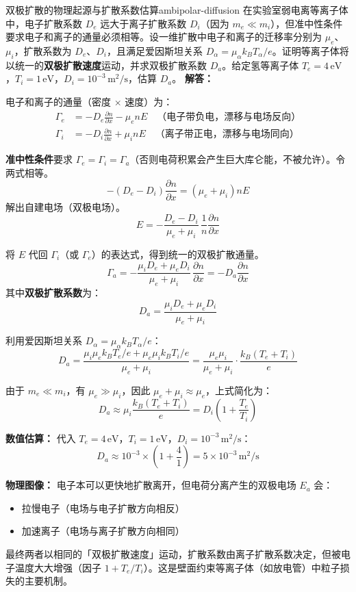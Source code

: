 \begin{example}{双极扩散的物理起源与扩散系数估算}{ambipolar-diffusion}
在实验室弱电离等离子体中，电子扩散系数 $D_e$ 远大于离子扩散系数 $D_i$（因为 $m_e\ll m_i$），但准中性条件要求电子和离子的通量必须相等。设一维扩散中电子和离子的迁移率分别为 $\mu_e$、$\mu_i$，扩散系数为 $D_e$、$D_i$，且满足爱因斯坦关系 $D_\alpha = \mu_\alpha k_{\!B}T_\alpha/e$。证明等离子体将以统一的\textbf{双极扩散速度}运动，并求双极扩散系数 $D_a$。给定氢等离子体 $T_e=4\,\mathrm{eV}$，$T_i=1\,\mathrm{eV}$，$D_i=10^{-3}\,\mathrm{m^2/s}$，估算 $D_a$。
\tcblower
\textbf{解答：}

电子和离子的通量（密度 $\times$ 速度）为：
\begin{align*}
\Gamma_e &= -D_e\frac{\partial n}{\partial x} - \mu_e n E \quad \text{（电子带负电，漂移与电场反向）}\\
\Gamma_i &= -D_i\frac{\partial n}{\partial x} + \mu_i n E \quad \text{（离子带正电，漂移与电场同向）}
\end{align*}

\textbf{准中性条件}要求 $\Gamma_e = \Gamma_i = \Gamma_a$（否则电荷积累会产生巨大库仑能，不被允许）。令两式相等。
\[
-(D_e - D_i)\frac{\partial n}{\partial x} = (\mu_e + \mu_i)nE
\]
解出自建电场（双极电场）。
\[
E = -\frac{D_e - D_i}{\mu_e + \mu_i}\,\frac{1}{n}\frac{\partial n}{\partial x}
\]

将 $E$ 代回 $\Gamma_i$（或 $\Gamma_e$）的表达式，得到统一的双极扩散通量。
\[
\Gamma_a = -\frac{\mu_i D_e + \mu_e D_i}{\mu_e + \mu_i}\,\frac{\partial n}{\partial x} = -D_a\frac{\partial n}{\partial x}
\]
其中\textbf{双极扩散系数}为：
\[
D_a = \frac{\mu_i D_e + \mu_e D_i}{\mu_e + \mu_i}
\]

利用爱因斯坦关系 $D_\alpha = \mu_\alpha k_{\!B}T_\alpha/e$：
\[
D_a = \frac{\mu_i\mu_e k_{\!B}T_e/e + \mu_e\mu_i k_{\!B}T_i/e}{\mu_e + \mu_i} = \frac{\mu_e\mu_i}{\mu_e + \mu_i}\cdot\frac{k_{\!B}(T_e + T_i)}{e}
\]

由于 $m_e\ll m_i$，有 $\mu_e\gg\mu_i$，因此 $\mu_e + \mu_i \approx \mu_e$，上式简化为：
\[
D_a \approx \mu_i\frac{k_{\!B}(T_e + T_i)}{e} = D_i\left(1 + \frac{T_e}{T_i}\right)
\]

\textbf{数值估算：} 代入 $T_e=4\,\mathrm{eV}$，$T_i=1\,\mathrm{eV}$，$D_i=10^{-3}\,\mathrm{m^2/s}$：
\[
D_a \approx 10^{-3}\times\left(1 + \frac{4}{1}\right) = 5\times 10^{-3}\,\mathrm{m^2/s}
\]

\textbf{物理图像：} 电子本可以更快地扩散离开，但电荷分离产生的双极电场 $E_a$ 会：
\begin{itemize}[leftmargin=*,itemsep=0pt]
\item 拉慢电子（电场与电子扩散方向相反）
\item 加速离子（电场与离子扩散方向相同）
\end{itemize}
最终两者以相同的「双极扩散速度」运动，扩散系数由离子扩散系数决定，但被电子温度大大增强（因子 $1+T_e/T_i$）。这是壁面约束等离子体（如放电管）中粒子损失的主要机制。
\end{example}

